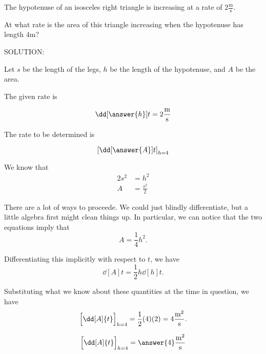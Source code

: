 \documentclass{ximera}
\author{Steven Gubkin}
\begin{document}
\begin{exercise}

The hypotenuse of an isosceles right triangle is increasing at a rate
of $2 \frac{\textrm{m}}{\textrm{s}}$.

At what rate is the area of this triangle increasing when the
hypotenuse has length $4 \textrm{m}$?



SOLUTION:

  Let $s$ be the length of the legs, $h$ be the length of the
  hypotenuse, and $A$ be the area. 


The given rate is

\[
\dd[\answer{h}]{t}=2\frac{\textrm{m}}{\textrm{s}}
\]



The rate to be determined  is

\[
\left[\dd[\answer{A}]{t}\right]_{h=4} 
\]

\begin{hint}
 We know that
\begin{align*}
	2s^2 &= h^2\\
	A &=\frac{s^2}{2}
\end{align*}
\end{hint}

\begin{hint}
  There are a lot of ways to proceede.  We could just blindly
  differentiate, but a little algebra first might clean things up.  In
  particular, we can notice that the two equations imply that
\[
A = \frac{1}{4} h^2.
\]
\end{hint}

\begin{hint}
  Differentiating this implicitly with respect to $t$, we have
\[
\dd[A]{t} = \frac{1}{2} h \dd[h]{t}.
\]
\end{hint}

\begin{hint}
  Substituting what we know about these quantities at the time in
  question, we have
  \[
 \Bigl[ \dd[A]{t} \Bigr]_{h=4}= \frac{1}{2} (4) (2) = 4\frac{\textrm{m}^2}{\textrm{s}}.
  \]
\end{hint}

\begin{prompt}
  \[
 \Bigl[ \dd[A]{t} \Bigr]_{h=4} = \answer{4}\frac{\textrm{m}^2}{\textrm{s}}
  \]
\end{prompt}
\end{exercise}
\end{document}
